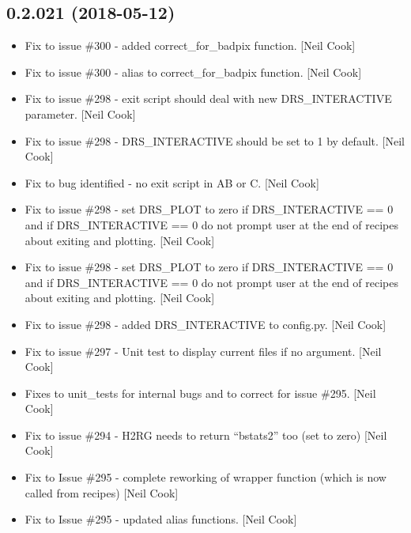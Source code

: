 \documentclass[a4paper,10pt,english]{report}
\begin{document}
\subsection{0.2.021 (2018-05-12)}
\label{\detokenize{misc/changelog:id438}}\begin{itemize}
\item {} 
Fix to issue \#300 - added correct\_for\_badpix function. {[}Neil Cook{]}

\item {} 
Fix to issue \#300 - alias to correct\_for\_badpix function. {[}Neil Cook{]}

\item {} 
Fix to issue \#298 - exit script should deal with new DRS\_INTERACTIVE
parameter. {[}Neil Cook{]}

\item {} 
Fix to issue \#298 - DRS\_INTERACTIVE should be set to 1 by default.
{[}Neil Cook{]}

\item {} 
Fix to bug identified - no exit script in AB or C. {[}Neil Cook{]}

\item {} 
Fix to issue \#298 - set DRS\_PLOT to zero if DRS\_INTERACTIVE == 0 and
if DRS\_INTERACTIVE == 0 do not prompt user at the end of recipes about
exiting and plotting. {[}Neil Cook{]}

\item {} 
Fix to issue \#298 - set DRS\_PLOT to zero if DRS\_INTERACTIVE == 0 and
if DRS\_INTERACTIVE == 0 do not prompt user at the end of recipes about
exiting and plotting. {[}Neil Cook{]}

\item {} 
Fix to issue \#298 - added DRS\_INTERACTIVE to config.py. {[}Neil Cook{]}

\item {} 
Fix to issue \#297 - Unit test to display current files if no argument.
{[}Neil Cook{]}

\item {} 
Fixes to unit\_tests for internal bugs and to correct for issue \#295.
{[}Neil Cook{]}

\item {} 
Fix to issue \#294 - H2RG needs to return “bstats2” too (set to zero)
{[}Neil Cook{]}

\item {} 
Fix to Issue \#295 - complete reworking of wrapper function (which is
now called from recipes) {[}Neil Cook{]}

\item {} 
Fix to Issue \#295 - updated alias functions. {[}Neil Cook{]}


\end{itemize}
\end{document}
